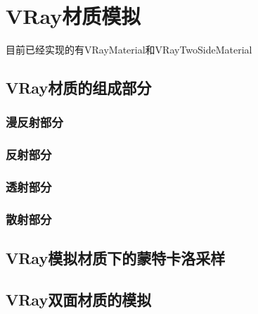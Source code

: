 \chapter{VRay材质模拟}
\label{cha:vray}

目前已经实现的有VRayMaterial和VRayTwoSideMaterial

\section{VRay材质的组成部分}
\subsection{漫反射部分}
\subsection{反射部分}
\subsection{透射部分}
\subsection{散射部分}

\section{VRay模拟材质下的蒙特卡洛采样}

\section{VRay双面材质的模拟}